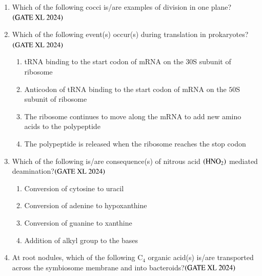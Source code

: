 \documentclass[journal]{IEEEtran}
\begin{document}
\begin{enumerate}
    \item Which of the following cocci is/are examples of division in one plane?\hfill $\left(\text{GATE XL 2024}\right)$
    \begin{enumerate}
    \end{enumerate}

    \item Which of the following event(s) occur(s) during translation in prokaryotes?\hfill $\left(\text{GATE XL 2024}\right)$
    \begin{enumerate}
        \item tRNA binding to the start codon of mRNA on the $30$S subunit of ribosome
        \item Anticodon of tRNA binding to the start codon of mRNA on the $50$S subunit of ribosome
        \item The ribosome continues to move along the mRNA to add new amino acids to the polypeptide
        \item The polypeptide is released when the ribosome reaches the stop codon
    \end{enumerate}

    \item Which of the following is/are consequence(s) of nitrous acid $\left(\text{HNO}_2\right)$ mediated deamination?\hfill $\left(\text{GATE XL 2024}\right)$
    \begin{enumerate}
        \item Conversion of cytosine to uracil
        \item Conversion of adenine to hypoxanthine
        \item Conversion of guanine to xanthine
        \item Addition of alkyl group to the bases
    \end{enumerate}

    \item At root nodules, which of the following C$_4$ organic acid(s) is/are transported across the symbiosome membrane and into bacteroids?\hfill $\left(\text{GATE XL 2024}\right)$
    \begin{enumerate}
    \end{enumerate}


\end{enumerate}
\end{document}
